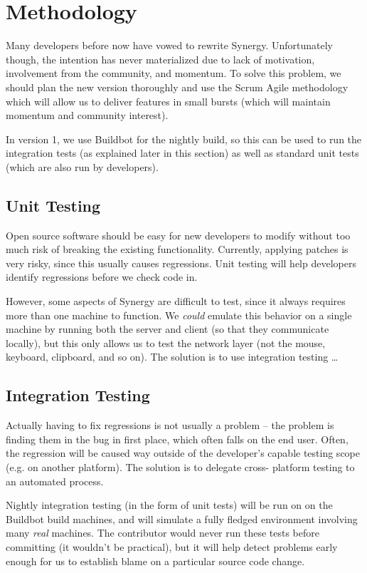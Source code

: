 \section{Methodology}

Many developers before now have vowed to rewrite Synergy. Unfortunately though,
the intention has never materialized due to lack of motivation, involvement from
the community, and momentum.
To solve this problem, we should plan the new version thoroughly and use the
Scrum Agile methodology which will allow us to deliver features in small 
bursts (which will maintain momentum and community interest).

In version 1, we use Buildbot for the nightly build, so this can be used to run
the integration tests (as explained later in this section) as well as standard 
unit tests (which are also run by developers).

\subsection{Unit Testing}

Open source software should be easy for new developers to modify without too
much risk of breaking the existing functionality. Currently, applying patches 
is very risky, since this usually causes regressions. Unit testing will help 
developers identify regressions before we check code in.

However, some aspects of Synergy are difficult to test, since it always requires
more than one machine to function. We \textit{could} emulate this behavior on a 
single machine by running both the server and client (so that they communicate 
locally), but this only allows us to test the network layer (not the mouse,
keyboard, clipboard, and so on). The solution is to use integration testing
\ldots

\subsection{Integration Testing}

Actually having to fix regressions is not usually a problem -- the problem is
finding them in the bug in first place, which often falls on the end user. 
Often, the regression will be caused way outside of the developer's capable 
testing scope (e.g. on another platform). The solution is to delegate cross-
platform testing to an automated process.

Nightly integration testing (in the form of unit tests) will be run on on the 
Buildbot build machines, and will
simulate a fully fledged environment involving many \textit{real} machines. The 
contributor would never run these tests before committing (it wouldn't be 
practical), but it will help detect problems early enough for us to establish
blame on a particular source code change.

